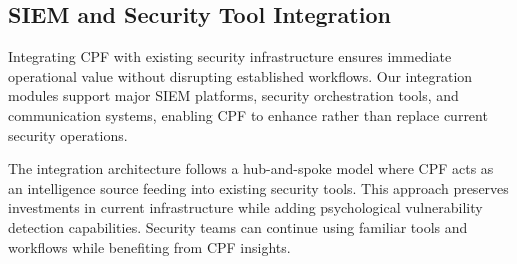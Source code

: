 \documentclass[11pt,a4paper]{article}
\begin{document}
\subsection{SIEM and Security Tool Integration}

Integrating CPF with existing security infrastructure ensures immediate operational value without disrupting established workflows. Our integration modules support major SIEM platforms, security orchestration tools, and communication systems, enabling CPF to enhance rather than replace current security operations.

The integration architecture follows a hub-and-spoke model where CPF acts as an intelligence source feeding into existing security tools. This approach preserves investments in current infrastructure while adding psychological vulnerability detection capabilities. Security teams can continue using familiar tools and workflows while benefiting from CPF insights.
\end{document}
